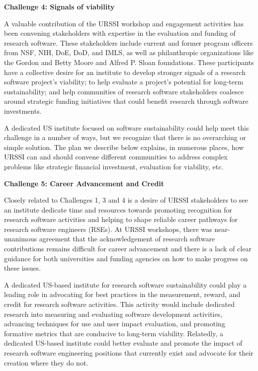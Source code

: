 \documentclass[
]{book}
\begin{document}
\textbf{Challenge 4: Signals of viability}

A valuable contribution of the URSSI workshop and engagement activities has
been convening stakeholders with expertise in the evaluation and funding of
research software. These stakeholders include current and former program officers
from NSF, NIH, DoE, DoD, and IMLS, as well as philanthropic organizations
like the Gordon and Betty Moore and Alfred P. Sloan foundations. These
participants have a collective desire for an institute to develop stronger
signals of a research software project's viability; to help evaluate a
project's potential for long-term sustainability; and help communities of
research software stakeholders coalesce around strategic funding initiatives
that could benefit research through software investments.

A dedicated US institute focused on software sustainability could help meet
this challenge in a number of ways, but we recognize that there is no
overarching or simple solution. The plan we describe below explains,
in numerous places, how URSSI can and should convene different communities
to address complex problems like strategic financial investment, evaluation
for viability, etc.

\textbf{Challenge 5: Career Advancement and Credit}

Closely related to Challenges 1, 3 and 4 is a desire of URSSI stakeholders to
see an institute dedicate time and resources towards promoting recognition
for research software activities and helping to shape reliable career pathways
for research software engineers (RSEs). At URSSI workshops, there was
near-unanimous agreement that the acknowledgement of research software
contributions remains difficult for career advancement and there is a lack
of clear guidance for both universities and funding agencies on how to make
progress on these issues.

A dedicated US-based institute for research software sustainability could
play a leading role in advocating for best practices in the measurement,
reward, and credit for research software activities. This activity would include
dedicated research into measuring and evaluating software development activities,
advancing techniques for use and user impact evaluation, and promoting formative
metrics that are conducive to long-term viability. Relatedly, a dedicated US-based
institute could better evaluate and promote the impact of research software
engineering positions that currently exist and advocate for their creation
where they do not.
\end{document}

